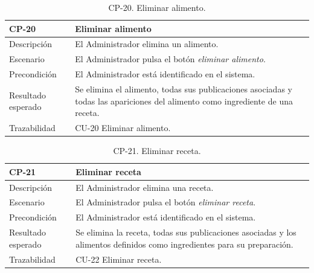            \begin{table}[H]
                \centering
                \begin{tabularx}{1\textwidth} { 
                    | >{\raggedright\arraybackslash}X 
                    | >{\raggedright\arraybackslash}X 
                    | >{\raggedright\arraybackslash}X 
                    |  }
                \hline
                \textbf{CP-20}     & \textbf{Eliminar alimento}                             \\ \hline
                Descripción        & El Administrador elimina un alimento.      \\ \hline
                Escenario          & El Administrador pulsa el botón \textit{eliminar alimento}.                            \\ \hline
                Precondición          & El Administrador está identificado en el sistema.                             \\ \hline
               
                Resultado esperado & Se elimina el alimento, todas sus publicaciones asociadas y todas las apariciones del alimento como ingrediente de una receta. \\ \hline
                Trazabilidad & CU-20 Eliminar alimento.\\ \hline
            \end{tabularx}
            \caption{CP-20. Eliminar alimento.}
            \label{table:CP-20}
                \end{table}


        \begin{table}[H]
            \centering
            \begin{tabularx}{1\textwidth} { 
                | >{\raggedright\arraybackslash}X 
                | >{\raggedright\arraybackslash}X 
                | >{\raggedright\arraybackslash}X 
                |  }
            \hline
            \textbf{CP-21}     & \textbf{Eliminar receta}                             \\ \hline
            Descripción        & El Administrador elimina una receta.      \\ \hline
            Escenario          & El Administrador pulsa el botón \textit{eliminar receta}.                          \\ \hline
            Precondición          & El Administrador está identificado en el sistema.                             \\ \hline
         
            Resultado esperado & Se elimina la receta, todas sus publicaciones asociadas y los alimentos definidos como ingredientes para su preparación. \\ \hline
            Trazabilidad & CU-22 Eliminar receta.\\ \hline
        \end{tabularx}
        \caption{CP-21. Eliminar receta.}
        \label{table:CP-21}
            \end{table}



